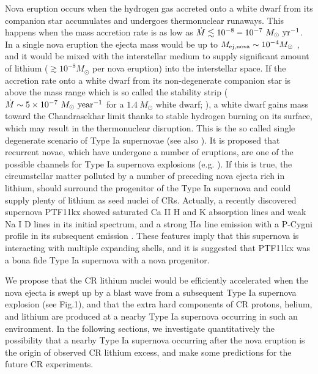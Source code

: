 \documentclass[twocolumn,showpacs,amsmath,amssymb]{revtex4-1}
\begin{document}
Nova eruption occurs when the hydrogen gas accreted onto a white dwarf from its companion star accumulates and undergoes thermonuclear runaways.  This happens when the mass accretion rate is as low as $\dot{M}\lesssim 10^{-8}-10^{-7}~M_{\odot}~{\rm yr}^{-1}$.  In a single nova eruption the ejecta mass would be up to $M_{\rm ej, nova}\sim 10^{-4}M_{\odot}$ \cite{1980AJ.....85..283S}, and it would be mixed with the interstellar medium to supply significant amount of lithium ($\gtrsim 10^{-8}M_{\odot}$ per nova eruption) into the interstellar space.   If the accretion rate onto a white dwarf from its non-degenerate companion star is above the mass range which is so called the stability strip ($\dot{M}\sim 5\times 10^{-7}~M_{\odot}~{\rm year}^{-1}$ for a $1.4~M_{\odot}$ white dwarf; \cite{1982ApJ...253..798N}), a white dwarf gains mass toward the Chandrasekhar limit thanks to stable hydrogen burning on its surface, which may result in the thermonuclear disruption.  This is the so called single degenerate scenario of Type Ia supernovae \cite{1973ApJ...186.1007W, 2012NewAR..56..122W} (see also \cite{2014ARA&A..52..107M}).  It is proposed that recurrent novae, which have undergone a number of eruptions, are one of the possible channels for Type Ia supernova explosions (e.g. \cite{2000ApJ...536L..93H, 2001ApJ...558..323H}).  If this is true, the circumstellar matter polluted by a number of preceding nova ejecta rich in lithium, should surround the progenitor of the Type Ia supernova and could supply plenty of lithium as seed nuclei of CRs.  Actually, a recently discovered supernova PTF11kx showed saturated Ca II H and K absorption lines and weak Na I D lines in its initial spectrum, and a strong H$\alpha$ line emission with a P-Cygni profile in its subsequent emission \cite{2012Sci...337..942D}.  These features imply that this supernova is interacting with multiple expanding shells, and it is suggested that PTF11kx was a bona fide Type Ia supernova with a nova progenitor.

We propose that the CR lithium nuclei would be efficiently accelerated when the nova ejecta is swept up by a blast wave from a subsequent Type Ia supernova explosion (see Fig.1), and that the extra hard components of CR protons, helium, and lithium are produced at a nearby Type Ia supernova occurring in such an environment.  In the following sections, we investigate quantitatively the possibility that a nearby Type Ia supernova occurring after the nova eruption is the origin of observed CR lithium excess, and make some predictions for the future CR experiments.
\end{document}
